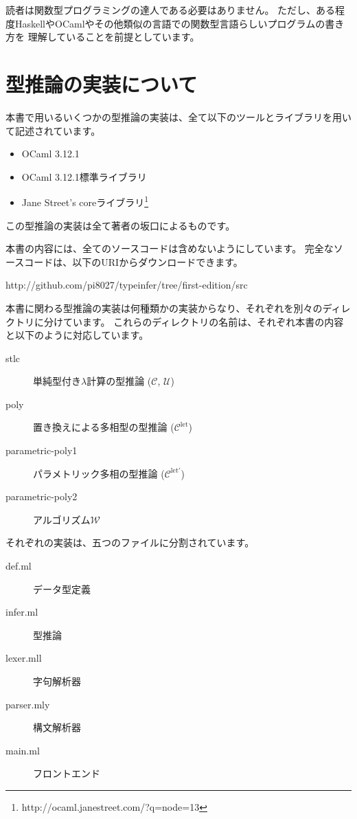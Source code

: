 読者は関数型プログラミングの達人である必要はありません。
ただし、ある程度HaskellやOCamlやその他類似の言語での関数型言語らしいプログラムの書き方を
理解していることを前提としています。

\section*{型推論の実装について}

本書で用いるいくつかの型推論の実装は、全て以下のツールとライブラリを用いて記述されています。

\begin{itemize}
 \item OCaml 3.12.1
 \item OCaml 3.12.1標準ライブラリ
 \item Jane Street's coreライブラリ\footnote{http://ocaml.janestreet.com/?q=node=13}
\end{itemize}

この型推論の実装は全て著者の坂口によるものです。

本書の内容には、全てのソースコードは含めないようにしています。
完全なソースコードは、以下のURIからダウンロードできます。

http://github.com/pi8027/typeinfer/tree/first-edition/src

本書に関わる型推論の実装は何種類かの実装からなり、それぞれを別々のディレクトリに分けています。
これらのディレクトリの名前は、それぞれ本書の内容と以下のように対応しています。

\begin{description}
  \item[stlc] 単純型付き$\lambda$計算の型推論 ($\mathcal C$, $\mathcal U$)
  \item[poly] 置き換えによる多相型の型推論 ($\mathcal C^\mathrm{let}$)
  \item[parametric-poly1] パラメトリック多相の型推論 ($\mathcal C^\mathrm{let'}$)
  \item[parametric-poly2] アルゴリズム$\mathcal W$
\end{description}

それぞれの実装は、五つのファイルに分割されています。

\begin{description}
  \item[def.ml] データ型定義
  \item[infer.ml] 型推論
  \item[lexer.mll] 字句解析器
  \item[parser.mly] 構文解析器
  \item[main.ml] フロントエンド
\end{description}

